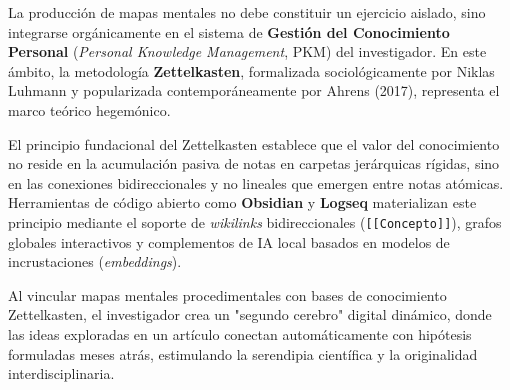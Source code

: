 La producción de mapas mentales no debe constituir un ejercicio aislado, sino integrarse orgánicamente en el sistema de \textbf{Gestión del Conocimiento Personal} (\textit{Personal Knowledge Management}, PKM) del investigador. En este ámbito, la metodología \textbf{Zettelkasten}, formalizada sociológicamente por Niklas Luhmann y popularizada contemporáneamente por Ahrens (2017), representa el marco teórico hegemónico.

El principio fundacional del Zettelkasten establece que el valor del conocimiento no reside en la acumulación pasiva de notas en carpetas jerárquicas rígidas, sino en las conexiones bidireccionales y no lineales que emergen entre notas atómicas. Herramientas de código abierto como \textbf{Obsidian} y \textbf{Logseq} materializan este principio mediante el soporte de \textit{wikilinks} bidireccionales (\texttt{[[Concepto]]}), grafos globales interactivos y complementos de IA local basados en modelos de incrustaciones (\textit{embeddings}). 

Al vincular mapas mentales procedimentales con bases de conocimiento Zettelkasten, el investigador crea un "segundo cerebro" digital dinámico, donde las ideas exploradas en un artículo conectan automáticamente con hipótesis formuladas meses atrás, estimulando la serendipia científica y la originalidad interdisciplinaria.

